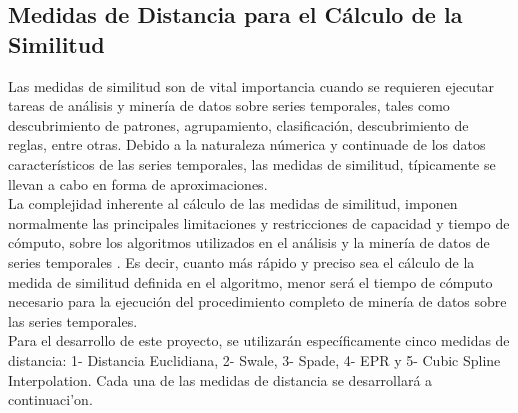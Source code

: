 \subsection{Medidas de Distancia para el C\'alculo de la Similitud}
Las medidas de similitud son de vital importancia cuando se requieren ejecutar tareas de an\'alisis y miner\'ia de datos sobre series temporales, tales como descubrimiento de patrones, agrupamiento, clasificaci\'on, descubrimiento de reglas, entre otras. Debido a la naturaleza n\'umerica y continuade de los datos caracter\'isticos de las series temporales, las medidas de similitud, t\'ipicamente se llevan a cabo en forma de aproximaciones.\\
La complejidad inherente al c\'alculo de las medidas de similitud, imponen normalmente las principales limitaciones y restricciones de capacidad y tiempo de c\'omputo, sobre los algoritmos utilizados en el an\'alisis y la miner\'ia de datos de series temporales \cite{algoanalysis}. Es decir, cuanto m\'as r\'apido y preciso sea el c\'alculo de la medida de similitud definida en el algoritmo, menor ser\'a el tiempo de c\'omputo necesario para la ejecuci\'on del procedimiento completo de miner\'ia de datos sobre las series temporales.\\
Para el desarrollo de este proyecto, se utilizar\'an espec\'ificamente cinco medidas de distancia: 1- Distancia Euclidiana, 2-  Swale, 3- Spade, 4- EPR y 5- Cubic Spline Interpolation. Cada una de las medidas de distancia se desarrollar\'a a continuaci'on.
